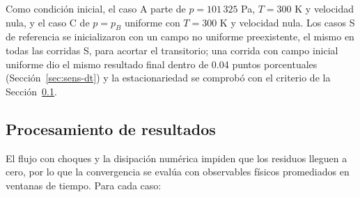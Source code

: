 \documentclass[12pt,letterpaper]{article}
\numberwithin{equation}{section}
\begin{document}
Como condición inicial, el caso A parte de $p=101\,325$ Pa, $T=300$ K y velocidad nula, y el caso C de $p=p_B$ uniforme con $T=300$ K y velocidad nula. Los casos S de referencia se inicializaron con un campo no uniforme preexistente, el mismo en todas las corridas S, para acortar el transitorio; una corrida con campo inicial uniforme dio el mismo resultado final dentro de 0.04 puntos porcentuales (Sección~\ref{sec:sens-dt}) y la estacionariedad se comprobó con el criterio de la Sección~\ref{sec:criterio}.

\subsection{Procesamiento de resultados}
\label{sec:criterio}

El flujo con choques y la disipación numérica impiden que los residuos lleguen a cero, por lo que la convergencia se evalúa con observables físicos promediados en ventanas de tiempo. Para cada caso:
\end{document}
